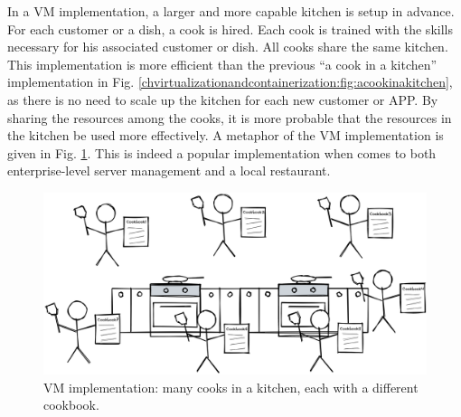 In a VM implementation, a larger and more capable kitchen is setup in advance. For each customer or a dish, a cook is hired. Each cook is trained with the skills necessary for his associated customer or dish. All cooks share the same kitchen. This implementation is more efficient than the previous ``a cook in a kitchen'' implementation in Fig. \ref{chvirtualizationandcontainerization:fig:acookinakitchen}, as there is no need to scale up the kitchen for each new customer or APP. By sharing the resources among the cooks, it is more probable that the resources in the kitchen be used more effectively. A metaphor of the VM implementation is given in Fig. \ref{chvirtualizationandcontainerization:fig:manycooksinakitchen}. This is indeed a popular implementation when comes to both enterprise-level server management and a local restaurant.
\begin{figure}
	\centering
	\includegraphics[width=350pt]{chapters/ch_virtualization_and_containerization/figures/manycooksinakitchen.png}
	\caption{VM implementation: many cooks in a kitchen, each with a different cookbook.} \label{chvirtualizationandcontainerization:fig:manycooksinakitchen}
\end{figure}

